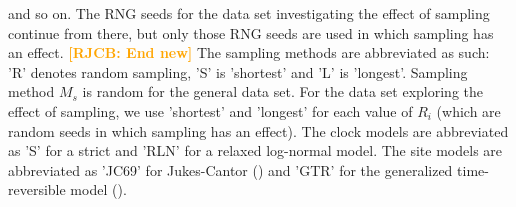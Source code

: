 \documentclass{article}
\newcommand*\richel[1]{\textcolor{orange}{\textbf{[RJCB: #1]}}}
\begin{document}
\begin{table}
{    and so on.  
    The RNG seeds for the data set investigating the effect 
    of sampling continue from there, but only those RNG seeds are used in which sampling has an effect.
    \richel{End new}
    The sampling methods are abbreviated as such: 'R' denotes random
    sampling, 'S' is 'shortest' and 'L' is 'longest'. Sampling method $M_s$ is random for the general
    data set. For the data set exploring the effect of sampling, we use 'shortest'
    and 'longest' for each value of $R_i$ (which are random seeds in which sampling has an effect).
    The clock models are abbreviated as 'S' for a strict and 'RLN' for a relaxed log-normal model.
    The site models are abbreviated as 'JC69' for Jukes-Cantor (\cite{jc69}) and 'GTR' for the generalized 
    time-reversible model (\cite{gtr}).
  }
  \label{table:parameters}
\end{table}
\end{document}
